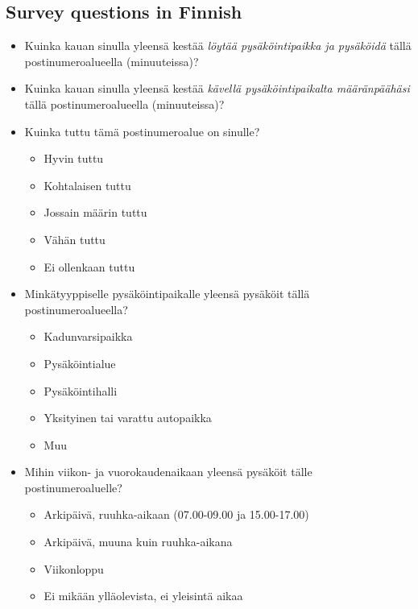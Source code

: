 \subsection{Survey questions in Finnish}
\justify
\begin{spacing}{1}
    \begin{itemize}
        \item Kuinka kauan sinulla yleensä kestää \textit{löytää pysäköintipaikka ja pysäköidä} tällä postinumeroalueella (minuuteissa)?
        \item Kuinka kauan sinulla yleensä kestää \textit{kävellä pysäköintipaikalta määränpäähäsi} tällä postinumeroalueella (minuuteissa)?
        \item Kuinka tuttu tämä postinumeroalue on sinulle?
        \begin{itemize}
            \item Hyvin tuttu
            \item Kohtalaisen tuttu
            \item Jossain määrin tuttu
            \item Vähän tuttu
            \item Ei ollenkaan tuttu
        \end{itemize}
        \item Minkätyyppiselle pysäköintipaikalle yleensä pysäköit tällä postinumeroalueella?
        \begin{itemize}
            \item Kadunvarsipaikka
            \item Pysäköintialue
            \item Pysäköintihalli
            \item Yksityinen tai varattu autopaikka
            \item Muu
        \end{itemize}
        \item Mihin viikon- ja vuorokaudenaikaan yleensä pysäköit tälle postinumeroaluelle?
        \begin{itemize}
            \item Arkipäivä, ruuhka-aikaan (07.00-09.00 ja 15.00-17.00) 
            \item Arkipäivä, muuna kuin ruuhka-aikana
            \item Viikonloppu
            \item Ei mikään ylläolevista, ei yleisintä aikaa
        \end{itemize}
    \end{itemize}
\end{spacing}

